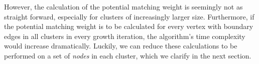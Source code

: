 
% 

However, the calculation of the potential matching weight is seemingly not as straight forward, especially for clusters of increasingly larger size. Furthermore, if the potential matching weight is to be calculated for every vertex with boundary edges in all clusters in every growth iteration, the algorithm's time complexity would increase dramatically. Luckily, we can reduce these calculations to be performed on a set of \emph{nodes} in each cluster, which we clarify in the next section.
